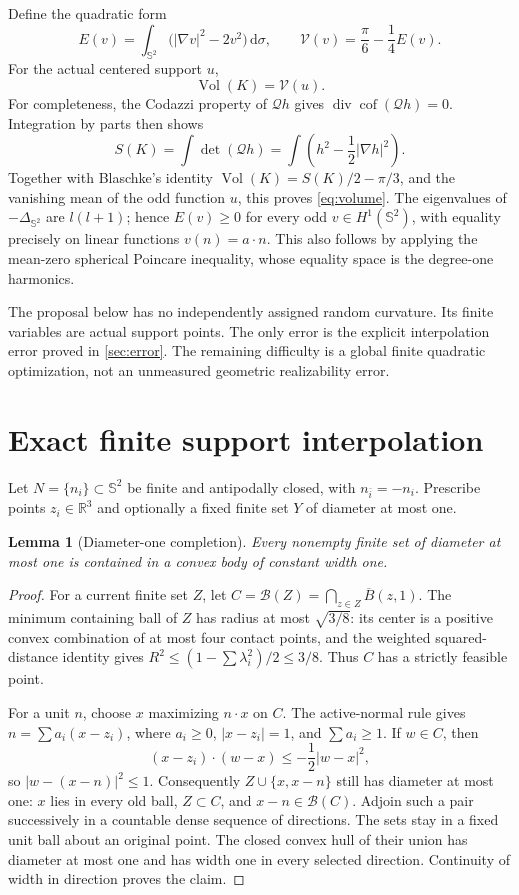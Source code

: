 \documentclass[11pt]{article}
\newtheorem{lemma}[theorem]{Lemma}
\theoremstyle{remark}\newtheorem{remark}[theorem]{Remark}
\newcommand{\R}{\mathbb R}
\newcommand{\Sph}{\mathbb S^2}
\newcommand{\Vol}{\operatorname{Vol}}
\newcommand{\Q}{\mathcal Q}
\newcommand{\B}{\mathcal B}
\newcommand{\dd}{\,\mathrm d}
\numberwithin{equation}{section}
\begin{document}
Define the quadratic form
\begin{equation}\label{eq:energy}
 E(v)=\int_{\Sph}\bigl(|\nabla v|^2-2v^2\bigr)\dd\sigma,
 \qquad
 \mathcal V(v)=\frac\pi6-\frac14 E(v).
\end{equation}
For the actual centered support $u$,
\begin{equation}\label{eq:volume}
 \Vol(K)=\mathcal V(u).
\end{equation}
For completeness, the Codazzi property of $\Q h$ gives
$\operatorname{div}\operatorname{cof}(\Q h)=0$. Integration by parts then
shows
\[
 S(K)=\int\det(\Q h)
     =\int\left(h^2-\frac12|\nabla h|^2\right).
\]
Together with Blaschke's identity $\Vol(K)=S(K)/2-\pi/3$, and the vanishing
mean of the odd function $u$, this proves \cref{eq:volume}.
The eigenvalues of $-\Delta_{\Sph}$ are $l(l+1)$; hence $E(v)\ge0$ for every
odd $v\in H^1(\Sph)$, with equality precisely on linear functions
$v(n)=a\cdot n$. This also follows by applying the mean-zero spherical
Poincare inequality, whose equality space is the degree-one harmonics.

The proposal below has no independently assigned random curvature. Its
finite variables are actual support points. The only error is the explicit
interpolation error proved in \cref{sec:error}. The remaining difficulty is
a global finite quadratic optimization, not an unmeasured geometric
realizability error.

\section{Exact finite support interpolation}
Let $N=\{n_i\}\subset\Sph$ be finite and antipodally closed, with
$n_{\bar i}=-n_i$. Prescribe points $z_i\in\R^3$ and optionally a fixed finite
set $Y$ of diameter at most one.

\begin{lemma}[Diameter-one completion]\label{lem:completion}
Every nonempty finite set of diameter at most one is contained in a convex
body of constant width one.
\end{lemma}
\begin{proof}
For a current finite set $Z$, let
$C=\B(Z)=\bigcap_{z\in Z}\overline B(z,1)$.
The minimum containing ball of $Z$ has radius at most $\sqrt{3/8}$: its
center is a positive convex combination of at most four contact points,
and the weighted squared-distance identity gives
$R^2\le(1-\sum\lambda_i^2)/2\le3/8$.
Thus $C$ has a strictly feasible point.

For a unit $n$, choose $x$ maximizing $n\cdot x$ on $C$. The active-normal
rule gives $n=\sum a_i(x-z_i)$, where $a_i\ge0$, $|x-z_i|=1$, and
$\sum a_i\ge1$. If $w\in C$, then
\[
 (x-z_i)\cdot(w-x)\le-\frac12|w-x|^2,
\]
so $|w-(x-n)|^2\le1$. Consequently $Z\cup\{x,x-n\}$ still has diameter at
most one: $x$ lies in every old ball, $Z\subset C$, and $x-n\in\B(C)$.
Adjoin such a pair successively in a countable dense sequence of directions.
The sets stay in a fixed unit ball about an original point. The closed
convex hull of their union has diameter at most one and has width one in
every selected direction. Continuity of width in direction proves the claim.
\end{proof}
\end{document}

